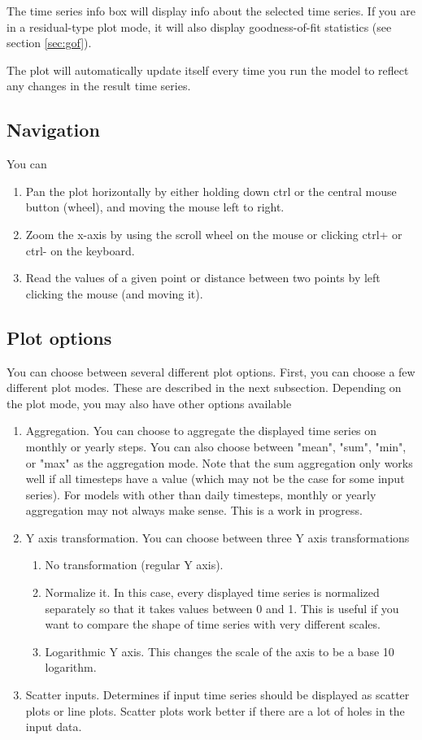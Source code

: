 \documentclass[11pt]{article}
\theoremstyle{definition}
\begin{document}
The time series info box will display info about the selected time series. If you are in a residual-type plot mode, it will also display goodness-of-fit statistics (see section \ref{sec:gof}).

The plot will automatically update itself every time you run the model to reflect any changes in the result time series.

\subsection{Navigation}
You can
\begin{enumerate}
\item Pan the plot horizontally by either holding down ctrl or the central mouse button (wheel), and moving the mouse left to right.
\item Zoom the x-axis by using the scroll wheel on the mouse or clicking ctrl+ or ctrl- on the keyboard.
\item Read the values of a given point or distance between two points by left clicking the mouse (and moving it).
\end{enumerate}

\subsection{Plot options}
You can choose between several different plot options. First, you can choose a few different plot modes. These are described in the next subsection. Depending on the plot mode, you may also have other options available

\begin{enumerate}[i]
\item Aggregation. You can choose to aggregate the displayed time series on monthly or yearly steps. You can also choose between "mean", "sum", "min", or "max" as the aggregation mode. Note that the sum aggregation only works well if all timesteps have a value (which may not be the case for some input series). For models with other than daily timesteps, monthly or yearly aggregation may not always make sense. This is a work in progress.
\item Y axis transformation. You can choose between three Y axis transformations
\begin{enumerate}
\item No transformation (regular Y axis).
\item Normalize it. In this case, every displayed time series is normalized separately so that it takes values between 0 and 1. This is useful if you want to compare the shape of time series with very different scales.
\item Logarithmic Y axis. This changes the scale of the axis to be a base 10 logarithm.
\end{enumerate}
\item Scatter inputs. Determines if input time series should be displayed as scatter plots or line plots. Scatter plots work better if there are a lot of holes in the input data.
\end{enumerate}
\end{document}
